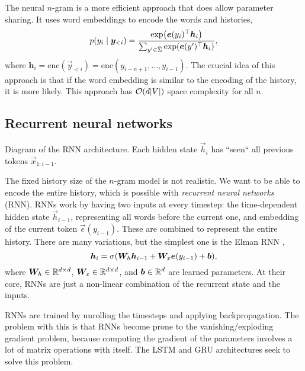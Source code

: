 The neural $n$-gram \citep{bengio2000neural} is a more efficient approach that does allow parameter
sharing. It uses word embeddings to encode the words and
histories, \[
    p(y_i\mid \bm{y}_{<i}) = \frac{\exp \lft( \transpose{\vec{e}(y_i)} \vec{h}_i \rgt)}{\sum_{y'\in\bar{\Sigma}} \exp \lft( \transpose{\vec{e}(y')} \vec{h}_i \rgt)},
\]
where $\bm{h}_i = \mathrm{enc}(\vec{y}_{<i}) =
    \text{enc}(y_{i-n+1},\ldots,y_{i-1})$. The crucial idea of this approach is that if the word embedding
is similar to the encoding of the history, it is more likely. This approach has
$\bigo{d|V|}$ space complexity for all $n$.

\subsection{Recurrent neural networks}

\begin{marginfigure}
    \centering
    \caption{Diagram of the RNN architecture. Each hidden state $\vec{h}_i$ has
    ``seen`` all previous tokens $\vec{x}_{1:{i-1}}$.}
    \label{fig:rnn}
\end{marginfigure}

The fixed history size of the $n$-gram model is not realistic. We want to be
able to encode the entire history, which is possible with \textit{recurrent
    neural networks} (RNN). RNNs work by having two inputs at every timestep: the
time-dependent hidden state $\vec{h}_{i-1}$, representing all words before the
current one, and embedding of the current token $\vec{e}(y_{i-1})$. These are
combined to represent the entire history. There are many variations, but the
simplest one is the Elman RNN \citep{elman1990finding}, \[
    \vec{h}_i = \sigma \lft( \mat{W}_h \vec{h}_{i-1} + \mat{W}_x \vec{e}(y_{i-1}) + \vec{b} \rgt),
\]
where $\bm{W}_h \in \mathbb{R}^{d\times d}$, $\bm{W}_x \in \mathbb{R}^{d\times d}$, and
$\bm{b} \in \mathbb{R}^d$ are learned parameters. At their core, RNNs are just a
non-linear combination of the recurrent state and the inputs.

RNNs are trained by unrolling the timesteps and applying backpropagation. The
problem with this is that RNNs become prone to the vanishing/exploding gradient
problem, because computing the gradient of the parameters involves a lot of
matrix operations with itself. The LSTM \citep{hochreiter1997long} and GRU
\citep{cho2014learning} architectures seek to solve this problem.


